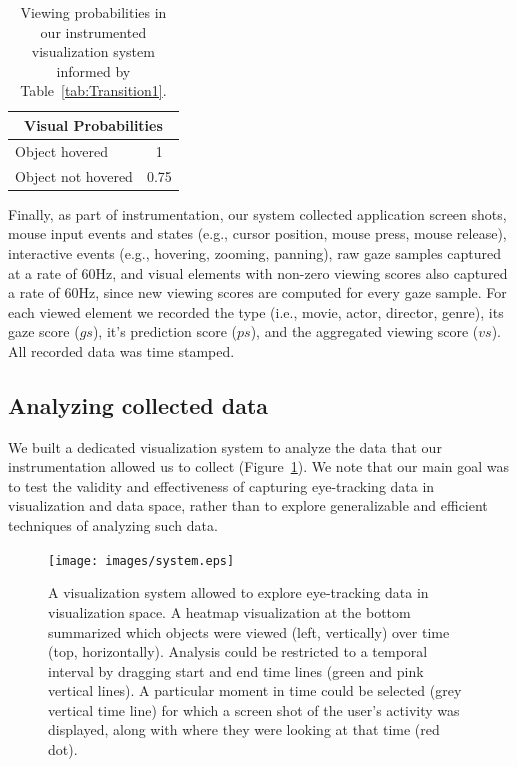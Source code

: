\begin{table}[htbp]
	\centering
		\begin{tabular}{|l|c|}
			\hline
			 \multicolumn{2}{|c|}{Visual Probabilities} \\ \hline
				Object hovered & 1\\\hline
				Object not hovered & 0.75\\
			\hline			
		\end{tabular}
	\caption{Viewing probabilities in our instrumented visualization system informed by Table~\ref{tab:Transition1}.}
	\label{tab:Transition3}
\end{table}



Finally, as part of instrumentation, our system collected application screen shots, mouse input events and states (e.g., cursor position, mouse press, mouse release), interactive events (e.g., hovering, zooming, panning), raw gaze samples captured at a rate of $60$Hz, and visual elements with non-zero viewing scores also captured a rate of $60$Hz, since new viewing scores are computed for every gaze sample. For each viewed element we recorded the type (i.e., movie, actor, director, genre), its gaze score ($gs$), it's prediction score ($ps$), and the aggregated viewing score ($vs$). All recorded data was time stamped. 

\subsection{Analyzing collected data}

We built a dedicated visualization system to analyze the data that our instrumentation allowed us to collect (Figure~\ref{fig:system}). We note that our main goal was to test the validity and effectiveness of capturing eye-tracking data in visualization and data space, rather than to explore generalizable and efficient techniques of analyzing such data.  

\begin{figure}[htb]
  \centering
  \texttt{[image: images/system.eps]}
  \caption{A visualization system allowed to explore eye-tracking data in visualization space. A heatmap visualization at the bottom summarized which objects were viewed (left, vertically) over time (top, horizontally). Analysis could be restricted to a temporal interval by dragging start and end time lines (green and pink vertical lines). A particular moment in time could be selected (grey vertical time line) for which a screen shot of the user's activity was displayed, along with where they were looking at that time (red dot). }
	\label{fig:system}
\end{figure}

